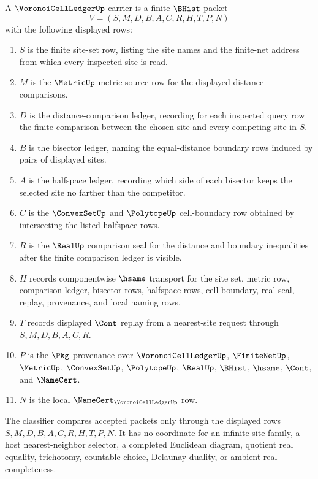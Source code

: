 \begin{definition}
\label{def:voronoi-cell-ledger-carrier}
A $\VoronoiCellLedgerUp$ carrier is a finite $\BHist$ packet
$$
V=(S,M,D,B,A,C,R,H,T,P,N)
$$
with the following displayed rows:
\begin{enumerate}
\item $S$ is the finite site-set row, listing the site names and the finite-net address from which every inspected site is read.
\item $M$ is the $\MetricUp$ metric source row for the displayed distance comparisons.
\item $D$ is the distance-comparison ledger, recording for each inspected query row the finite comparison between the chosen site and every competing site in $S$.
\item $B$ is the bisector ledger, naming the equal-distance boundary rows induced by pairs of displayed sites.
\item $A$ is the halfspace ledger, recording which side of each bisector keeps the selected site no farther than the competitor.
\item $C$ is the $\ConvexSetUp$ and $\PolytopeUp$ cell-boundary row obtained by intersecting the listed halfspace rows.
\item $R$ is the $\RealUp$ comparison seal for the distance and boundary inequalities after the finite comparison ledger is visible.
\item $H$ records componentwise $\hsame$ transport for the site set, metric row, comparison ledger, bisector rows, halfspace rows, cell boundary, real seal, replay, provenance, and local naming rows.
\item $T$ records displayed $\Cont$ replay from a nearest-site request through $S,M,D,B,A,C,R$.
\item $P$ is the $\Pkg$ provenance over $\VoronoiCellLedgerUp$, $\FiniteNetUp$, $\MetricUp$, $\ConvexSetUp$, $\PolytopeUp$, $\RealUp$, $\BHist$, $\hsame$, $\Cont$, and $\NameCert$.
\item $N$ is the local $\NameCert_{\VoronoiCellLedgerUp}$ row.
\end{enumerate}
The classifier compares accepted packets only through the displayed rows $S,M,D,B,A,C,R,H,T,P,N$. It has no coordinate for an infinite site family, a host nearest-neighbor selector, a completed Euclidean diagram, quotient real equality, trichotomy, countable choice, Delaunay duality, or ambient real completeness.
\end{definition}

